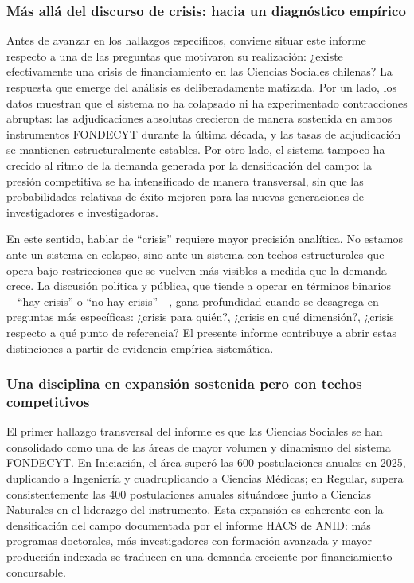 \documentclass[
  12pt,
  letterpaper,
]{article}
\begin{document}
\subsubsection{Más allá del discurso de crisis: hacia un diagnóstico
empírico}\label{muxe1s-alluxe1-del-discurso-de-crisis-hacia-un-diagnuxf3stico-empuxedrico}

Antes de avanzar en los hallazgos específicos, conviene situar este
informe respecto a una de las preguntas que motivaron su realización:
¿existe efectivamente una crisis de financiamiento en las Ciencias
Sociales chilenas? La respuesta que emerge del análisis es
deliberadamente matizada. Por un lado, los datos muestran que el sistema
no ha colapsado ni ha experimentado contracciones abruptas: las
adjudicaciones absolutas crecieron de manera sostenida en ambos
instrumentos FONDECYT durante la última década, y las tasas de
adjudicación se mantienen estructuralmente estables. Por otro lado, el
sistema tampoco ha crecido al ritmo de la demanda generada por la
densificación del campo: la presión competitiva se ha intensificado de
manera transversal, sin que las probabilidades relativas de éxito
mejoren para las nuevas generaciones de investigadores e investigadoras.

En este sentido, hablar de ``crisis'' requiere mayor precisión
analítica. No estamos ante un sistema en colapso, sino ante un sistema
con techos estructurales que opera bajo restricciones que se vuelven más
visibles a medida que la demanda crece. La discusión política y pública,
que tiende a operar en términos binarios ---``hay crisis'' o ``no hay
crisis''---, gana profundidad cuando se desagrega en preguntas más
específicas: ¿crisis para quién?, ¿crisis en qué dimensión?, ¿crisis
respecto a qué punto de referencia? El presente informe contribuye a
abrir estas distinciones a partir de evidencia empírica sistemática.

\subsubsection{Una disciplina en expansión sostenida pero con techos
competitivos}\label{una-disciplina-en-expansiuxf3n-sostenida-pero-con-techos-competitivos}

El primer hallazgo transversal del informe es que las Ciencias Sociales
se han consolidado como una de las áreas de mayor volumen y dinamismo
del sistema FONDECYT. En Iniciación, el área superó las 600
postulaciones anuales en 2025, duplicando a Ingeniería y cuadruplicando
a Ciencias Médicas; en Regular, supera consistentemente las 400
postulaciones anuales situándose junto a Ciencias Naturales en el
liderazgo del instrumento. Esta expansión es coherente con la
densificación del campo documentada por el informe HACS de ANID: más
programas doctorales, más investigadores con formación avanzada y mayor
producción indexada se traducen en una demanda creciente por
financiamiento concursable.
\end{document}
